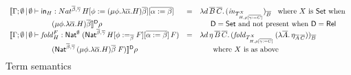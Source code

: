 \documentclass[runningheads]{llncs}
\newcommand{\set}{\mathsf{Set}}
\newcommand{\fold}{\mathit{fold}}
\begin{document}
\begin{figure}[t]
\begin{adjustbox}{varwidth=6in, max width=5.3in, fbox, center}
\[\begin{array}{lll}
\llbracket \Gamma;\emptyset \,|\, \emptyset \vdash \tin_H :
Nat^{\ol{\beta},\ol{\gamma}} \, H[\phi := (\mu \phi.\lambda {\overline
    \alpha}.H){\overline \beta}][\ol{\alpha := \beta}] & = &
\lambda d\,\ol{B}\,
\ol{C}.\,(\mathit{in}_{{T}^X_{H,\rho[\ol{\gamma :=
        C}]}})_{\ol{B}} \;\;\mbox{ where } X \mbox{ is } \set \mbox{ when } \\ 
\hspace*{0.79in}(\mu \phi.\lambda {\overline \alpha}.H){\overline
  \beta} \rrbracket^{\mathsf{D}} \rho & & \hspace*{0.2in}  
\mathsf{D} = \set \mbox{ and not present when }
\mathsf{D} = \rel\\  
\llbracket \Gamma;\emptyset \,|\, \emptyset \vdash
  \fold^F_H : \Nat^\emptyset\;(\Nat^{\ol{\beta}, \ol{\gamma}}\,H[\phi
    :=_{\ol{\beta}} F][\ol{\alpha := \beta}]\,F) & = &  
\lambda d\,\eta\,\ol{B}\,\ol{C}.\,
(\mathit{fold}_{T^X_{H,\rho[\ol{\gamma := C}]}} \, (\lambda
\ol{A}.\,\eta_{\ol{A}\,\ol{C}}))_{\ol{B}}\\ 
\hspace*{0.79in}(\Nat^{{\ol{\beta},\ol{\gamma}} }\,(\mu
  \phi.\lambda \overline \alpha.H)\overline \beta\;F)
\rrbracket^{\mathsf{D}} \rho & & \hspace*{0.2in} \mbox{ where } X \mbox{ is as above
}\vspace*{-0.1in} 
\end{array}\]
\caption{Term semantics}\label{fig:term-sem} 
\vspace*{-0.05in}
\end{adjustbox}
\end{figure}

\end{document}
